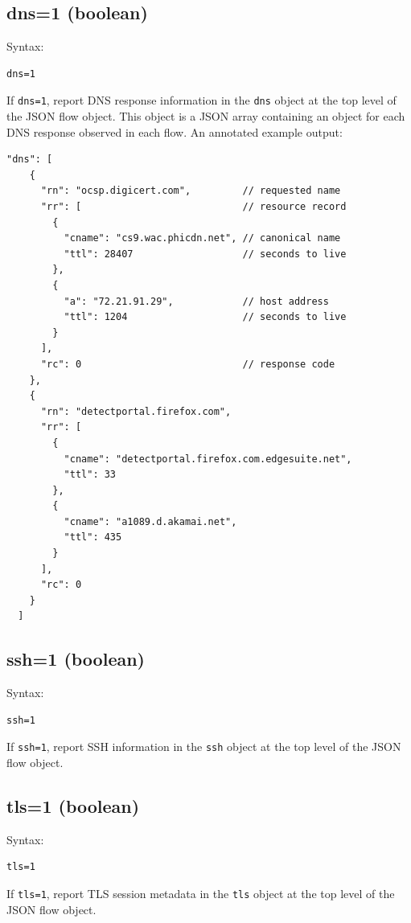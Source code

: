 \documentclass{book}
\begin{document}
\subsection{dns=1 (boolean)}
\label{dns}
\begin{mdframed}[style=aaa]
Syntax:
  \begin{verbatim}
dns=1                      
  \end{verbatim}
\end{mdframed}
If \texttt{dns=1}, report DNS response information in the \texttt{dns}
object at the top level of the JSON flow object.  This object is a
JSON array containing an object for each DNS response observed in each
flow.   An annotated example output:
\begin{mdframed}[style=cli]
\begin{verbatim}
"dns": [
    {
      "rn": "ocsp.digicert.com",         // requested name
      "rr": [                            // resource record
        {
          "cname": "cs9.wac.phicdn.net", // canonical name
          "ttl": 28407                   // seconds to live 
        },
        {
          "a": "72.21.91.29",            // host address 
          "ttl": 1204                    // seconds to live
        }
      ],
      "rc": 0                            // response code
    },
    {
      "rn": "detectportal.firefox.com", 
      "rr": [
        {
          "cname": "detectportal.firefox.com.edgesuite.net",
          "ttl": 33
        },
        {
          "cname": "a1089.d.akamai.net",
          "ttl": 435
        }
      ],
      "rc": 0
    }
  ]
\end{verbatim}
\end{mdframed}

 
\subsection{ssh=1 (boolean)}
\label{ssh}
\begin{mdframed}[style=aaa]
Syntax:
  \begin{verbatim}
ssh=1                      
  \end{verbatim}
\end{mdframed}
If \texttt{ssh=1}, report SSH information in the \texttt{ssh}
object at the top level of the JSON flow object.



\subsection{tls=1 (boolean)}
\label{tls}
\begin{mdframed}[style=aaa]
Syntax:
  \begin{verbatim}
tls=1                      
  \end{verbatim}
\end{mdframed}
If \texttt{tls=1}, report TLS session metadata in the \texttt{tls}
object at the top level of the JSON flow object.
\end{document}
